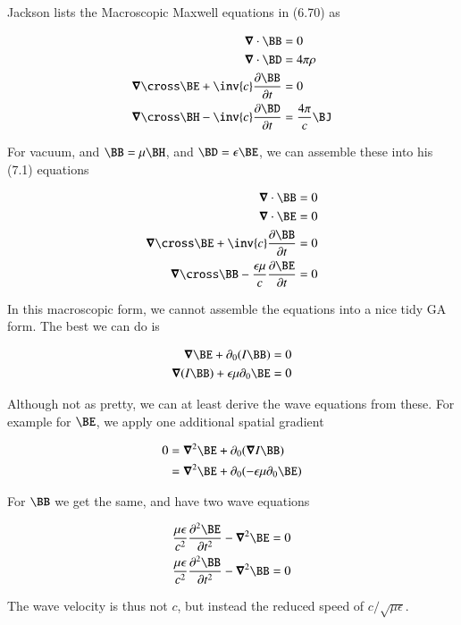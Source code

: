 \documentclass{article}
\begin{document}
Jackson lists the Macroscopic Maxwell equations in (6.70) as 

\begin{align*}
\spacegrad \cdot \BB &= 0 \\
\spacegrad \cdot \BD &= 4 \pi \rho \\
\spacegrad \cross \BE + \inv{c}\PD{t}{\BB} &= 0 \\
\spacegrad \cross \BH - \inv{c}\PD{t}{\BD} &= \frac{4 \pi}{c} \BJ  \\
\end{align*}

For vacuum, and $\BB = \mu \BH$, and $\BD = \epsilon \BE$, we can assemble these into his (7.1) equations

\begin{align*}
\spacegrad \cdot \BB &= 0 \\
\spacegrad \cdot \BE &= 0 \\
\spacegrad \cross \BE + \inv{c}\PD{t}{\BB} &= 0 \\
\spacegrad \cross \BB - \frac{\epsilon \mu}{c}\PD{t}{\BE} &= 0  \\
\end{align*}

In this macroscopic form, we cannot assemble the equations into a nice tidy GA form.  The best we can do is

\begin{align}
\spacegrad \BE + \partial_0 (I\BB) &= 0 \\
\spacegrad (I \BB) + \epsilon \mu \partial_0 \BE &= 0 
\end{align}

Although not as pretty, we can at least derive the wave equations from these.  For example for $\BE$, we apply one additional
spatial gradient

\begin{align*}
0 
&= \spacegrad^2 \BE + \partial_0 (\spacegrad I \BB) \\
&= \spacegrad^2 \BE + \partial_0 ( -\epsilon \mu \partial_0 \BE ) \\
\end{align*}

For $\BB$ we get the same, and have two wave equations

\begin{align}
\frac{\mu \epsilon}{c^2} \frac{\partial^2 \BE}{\partial t^2} - \spacegrad^2 \BE &= 0 \\
\frac{\mu \epsilon}{c^2} \frac{\partial^2 \BB}{\partial t^2} - \spacegrad^2 \BB &= 0
\end{align}

The wave velocity is thus not $c$, but instead the reduced speed of $c/{\sqrt{\mu\epsilon}}$.



\end{document}
